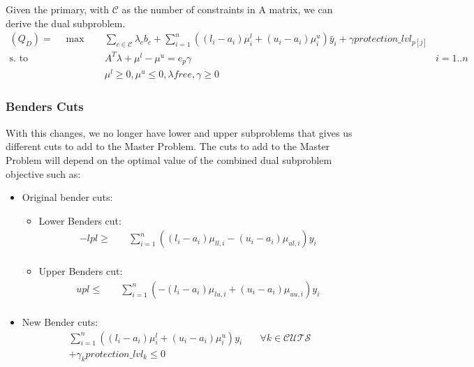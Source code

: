 \documentclass[11pt,a4paper]{article}
\begin{document}
Given the primary, with $\mathcal{C}$ as the number of constraints in A matrix, we can derive the dual subproblem.
\begin{align*}
(Q_{D}) = \quad \max \quad & \sum_{c \in \mathcal{C}} \lambda_c b_c
+ \sum_{i=1}^{n}((l_i - a_i)\mu_{i}^{l} + (u_i-a_i)\mu_{i}^{u})\bar{y}_i  
+ \gamma protection\_lvl_{p[j]}\\
\text{s. to}  \quad & A^T\lambda + \mu^{l}  - \mu^{u} = e_p \gamma & i= 1..n \\
& \mu^{l} \geq 0, \mu^{u} \leq 0, \lambda free, \gamma \geq 0 
\end{align*}

\subsubsection{Benders Cuts}

With this changes, we no longer have lower and upper subproblems that gives us different cuts to add to the Master Problem.
The cuts to add to the Master Problem will depend on the optimal value of the combined dual subproblem objective such as:
\begin{itemize}
    \item Original bender cuts:
    \begin{itemize}
        \item Lower Benders cut:
            \begin{align*}
            -lpl \geq \quad & \sum_{i=1}^{n}((l_i - a_i)\mu_{ll,i} - (u_i-a_i)\mu_{ul,i})y_i  \\
            \end{align*}
        \item Upper Benders cut:
            \begin{align*}
            upl \leq \quad & \sum_{i=1}^{n}(-(l_i - a_i)\mu_{lu,i} + (u_i-a_i)\mu_{uu,i})y_i  \\
            \end{align*}
    \end{itemize}
    \item New Bender cuts:
        \begin{align*}
        \sum_{i=1}^{n}((l_i - a_i)\mu_{i}^{l} + (u_i-a_i)\mu_{i}^{u})y_i & \quad \forall k \in \mathcal{CUTS} \\
        + \gamma_{k} protection\_lvl_{k} \leq 0 \\
        \end{align*}
\end{itemize}
\end{document}
